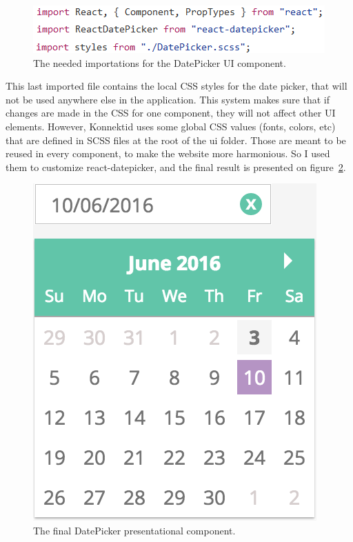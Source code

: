 \begin{figure}[H]
    \centering
    \includegraphics[scale=0.9]{figure/imports.png}
    \caption{The needed importations for the DatePicker UI component.}
    \label{fig:imports}
\end{figure}

This last imported file contains the local CSS styles for the date picker, that will not be used anywhere else in the application. This system makes sure that if changes are made in the CSS for one component, they will not affect other UI elements. However, Konnektid uses some global CSS values (fonts, colors, etc) that are defined in SCSS files at the root of the \guillemotleft{} ui \guillemotright{} folder. Those are meant to be reused in every component, to make the website more harmonious. So I used them to customize react-datepicker, and the final result is presented on {\sc figure}~\ref{fig:datePicker}.

\begin{figure}[H]
    \centering
    \includegraphics[scale=0.6]{figure/datePicker.png}
    \caption{The final DatePicker presentational component.}
    \label{fig:datePicker}
\end{figure}

